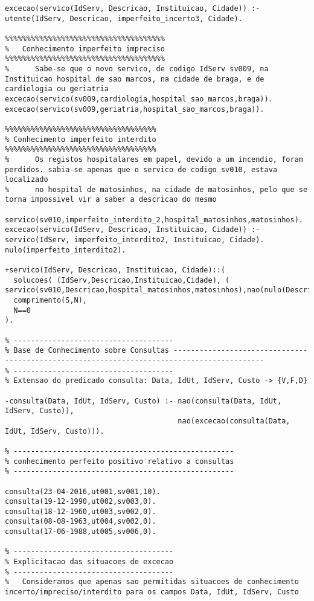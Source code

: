 \documentclass[
  oneside,
  10pt, a4paper,
  footinclude=true,
  headinclude=true,
  cleardoublepage=empty
]{scrbook}
\begin{document}
\begin{lstlisting}
excecao(servico(IdServ, Descricao, Instituicao, Cidade)) :- utente(IdServ, Descricao, imperfeito_incerto3, Cidade).

%%%%%%%%%%%%%%%%%%%%%%%%%%%%%%%%%%%%%
%   Conhecimento imperfeito impreciso
%%%%%%%%%%%%%%%%%%%%%%%%%%%%%%%%%%%%%
%      Sabe-se que o novo servico, de codigo IdServ sv009, na Instituicao hospital de sao marcos, na cidade de braga, e de cardiologia ou geriatria 
excecao(servico(sv009,cardiologia,hospital_sao_marcos,braga)).
excecao(servico(sv009,geriatria,hospital_sao_marcos,braga)).

%%%%%%%%%%%%%%%%%%%%%%%%%%%%%%%%%%%
% Conhecimento imperfeito interdito
%%%%%%%%%%%%%%%%%%%%%%%%%%%%%%%%%%%
%      Os registos hospitalares em papel, devido a um incendio, foram perdidos. sabia-se apenas que o servico de codigo sv010, estava localizado 
%      no hospital de matosinhos, na cidade de matosinhos, pelo que se torna impossivel vir a saber a descricao do mesmo 

servico(sv010,imperfeito_interdito_2,hospital_matosinhos,matosinhos).
excecao(servico(IdServ, Descricao, Instituicao, Cidade)) :- servico(IdServ, imperfeito_interdito2, Instituicao, Cidade).
nulo(imperfeito_interdito2).

+servico(IdServ, Descricao, Instituicao, Cidade)::(
  solucoes( (IdServ,Descricao,Instituicao,Cidade), ( servico(sv010,Descricao,hospital_matosinhos,matosinhos),nao(nulo(Descricao))),S),
  comprimento(S,N),
  N==0
).

% -------------------------------------
% Base de Conhecimento sobre Consultas -------------------------------------------------------------------------------------------
% -------------------------------------
% Extensao do predicado consulta: Data, IdUt, IdServ, Custo -> {V,F,D}

-consulta(Data, IdUt, IdServ, Custo) :- nao(consulta(Data, IdUt, IdServ, Custo)),
                                        nao(excecao(consulta(Data, IdUt, IdServ, Custo))).

% ---------------------------------------------------
% conhecimento perfeito positivo relativo a consultas
% ---------------------------------------------------

consulta(23-04-2016,ut001,sv001,10).
consulta(19-12-1990,ut002,sv003,0).
consulta(18-12-1960,ut003,sv002,0).
consulta(08-08-1963,ut004,sv002,0).
consulta(17-06-1988,ut005,sv006,0).

% -------------------------------------
% Explicitacao das situacoes de excecao
% -------------------------------------
%   Consideramos que apenas sao permitidas situacoes de conhecimento incerto/impreciso/interdito para os campos Data, IdUt, IdServ, Custo 


\end{lstlisting}
\end{document}
